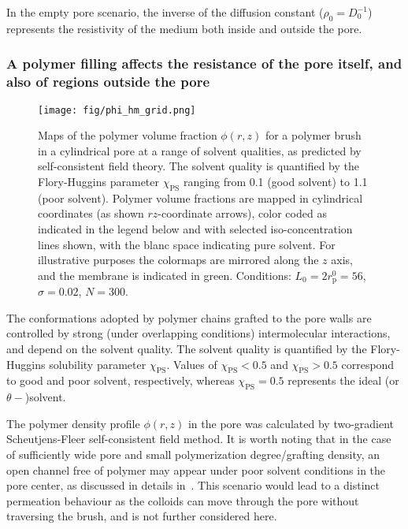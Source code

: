 \documentclass[12pt, a4paper]{article}
\begin{document}
In the empty pore scenario, the inverse of the diffusion constant ($\rho_0=D_0^{-1}$) represents the resistivity of the medium both inside and outside the pore. 

\subsubsection{A polymer filling affects the resistance of the pore itself, and also of regions outside the pore}

\begin{figure}
    \centering
    \texttt{[image: fig/phi\_hm\_grid.png]}
    \caption{
    Maps of the polymer volume fraction $\phi(r,z)$ for a polymer brush in a cylindrical pore at a range of solvent qualities, as predicted by self-consistent field theory. 
    The solvent quality is quantified by the Flory-Huggins parameter $\chi_{\text{PS}}$ ranging from 0.1 (good solvent) to 1.1 (poor solvent).
    Polymer volume fractions are mapped in cylindrical coordinates (as shown $rz$-coordinate arrows), color coded as indicated in the legend below and with selected iso-concentration lines shown, with the blanc space indicating pure solvent.
    For illustrative purposes the colormaps are mirrored along the $z$ axis, and the membrane is indicated in green.
    Conditions: $L_{0}=2r_{\text{p}}^{0}=56$, $\sigma=0.02$, $N=300$.
    }
    \label{fig:phi_hm_grid}
\end{figure}

The conformations adopted by polymer chains grafted to the pore walls are controlled by strong (under overlapping conditions) intermolecular interactions, and depend on the solvent quality. 
The solvent quality is quantified by the Flory-Huggins solubility parameter $\chi_{\text{PS}}$. 
Values of $\chi_{\text{PS}}<0.5$ and $\chi_{\text{PS}}>0.5$ correspond to good and poor solvent, respectively, whereas $\chi_{\text{PS}}=0.5$ represents the ideal (or $\theta-$)solvent.

The polymer density profile $\phi(r,z)$ in the pore was calculated by two-gradient Scheutjens-Fleer self-consistent field method.
It is worth noting that in the case of sufficiently wide pore and small polymerization degree/grafting density, 
an open channel free of polymer may appear under poor solvent conditions in the pore center, as discussed in details in~\cite{Laktionov2021}. 
This scenario would lead to a distinct permeation behaviour as the colloids can move through the pore without traversing the brush, and is not further considered here. 
\end{document}
